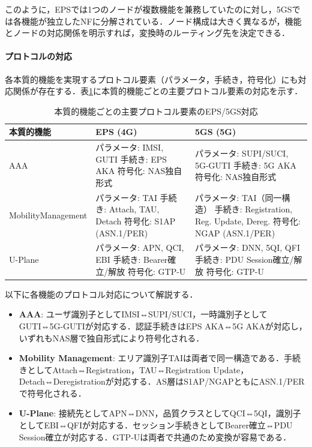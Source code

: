 このように，EPSでは1つのノードが複数機能を兼務していたのに対し，5GSでは各機能が独立したNFに分解されている．ノード構成は大きく異なるが，機能とノードの対応関係を明示すれば，変換時のルーティング先を決定できる．

\paragraph{プロトコルの対応}

各本質的機能を実現するプロトコル要素（パラメータ，手続き，符号化）にも対応関係が存在する．表\ref{tab:protocol_parameters}に本質的機能ごとの主要プロトコル要素の対応を示す．

\begin{table}[htbp]
\centering
\caption{本質的機能ごとの主要プロトコル要素のEPS/5GS対応}
\label{tab:protocol_parameters}
\begin{tabular}{|p{3cm}|p{5.5cm}|p{5.5cm}|}
\hline
\textbf{本質的機能} & \textbf{EPS (4G)} & \textbf{5GS (5G)} \\
\hline
AAA &
パラメータ: IMSI, GUTI\newline
手続き: EPS AKA\newline
符号化: NAS独自形式 &
パラメータ: SUPI/SUCI, 5G-GUTI\newline
手続き: 5G AKA\newline
符号化: NAS独自形式 \\
\hline
Mobility\newline Management &
パラメータ: TAI\newline
手続き: Attach, TAU, Detach\newline
符号化: S1AP (ASN.1/PER) &
パラメータ: TAI（同一構造）\newline
手続き: Registration, Reg. Update, Dereg.\newline
符号化: NGAP (ASN.1/PER) \\
\hline
U-Plane &
パラメータ: APN, QCI, EBI\newline
手続き: Bearer確立/解放\newline
符号化: GTP-U &
パラメータ: DNN, 5QI, QFI\newline
手続き: PDU Session確立/解放\newline
符号化: GTP-U \\
\hline
\end{tabular}
\end{table}

以下に各機能のプロトコル対応について解説する．

\begin{itemize}
  \item \textbf{AAA}: ユーザ識別子としてIMSI⇔SUPI/SUCI，一時識別子としてGUTI⇔5G-GUTIが対応する．認証手続きはEPS AKA⇔5G AKAが対応し，いずれもNAS層で独自形式により符号化される．
  \item \textbf{Mobility Management}: エリア識別子TAIは両者で同一構造である．手続きとしてAttach⇔Registration，TAU⇔Registration Update，Detach⇔Deregistrationが対応する．AS層はS1AP/NGAPともにASN.1/PERで符号化される．
  \item \textbf{U-Plane}: 接続先としてAPN⇔DNN，品質クラスとしてQCI⇔5QI，識別子としてEBI⇔QFIが対応する．セッション手続きとしてBearer確立⇔PDU Session確立が対応する．GTP-Uは両者で共通のため変換が容易である．
\end{itemize}

